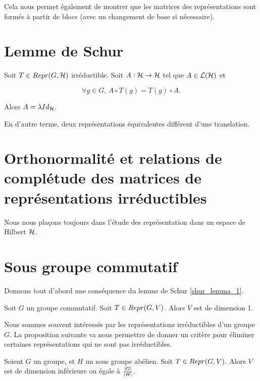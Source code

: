 Cela nous permet également de montrer que les matrices des représentations sont
formés à partir de blocs (avec un changement de base si nécessaire).

\section{Lemme de Schur}

\begin{proposition} 
	\label{shur_lemma_1}
	Soit $T \in Repr(G, \mathcal{H})$ irréductible.
	Soit $A : \mathcal{H} \rightarrow \mathcal{H}$
	tel que $A \in \mathcal{L}(\mathcal{H})$ et

	\begin{equation}
		\forall g \in G, \, A \circ T(g) = T(g) \circ A.
	\end{equation}

	Alors $A = \lambda Id_{\mathcal{H}}$.

	En d'autre terme, deux représentations équivalentes différent d'une
	translation.
\end{proposition}

\section{Orthonormalité et relations de complétude des matrices de
représentations irréductibles}

Nous nous plaçons toujours dans l'étude des représentation dans un espace de
Hilbert $\mathcal{H}$.



\section{Sous groupe commutatif}

Donnons tout d'abord une conséquence du lemme de Schur \ref{shur_lemma_1}.

\begin{proposition}
	Soit $G$ un groupe commutatif.
	Soit $T \in Repr(G, V)$. Alors $V$ est de dimension 1.
\end{proposition}

Nous sommes souvent intéressés par les représentations irréductibles d'un groupe
$G$. La proposition suivante va nous permettre de donner un critère pour
éliminer certaines représentations qui ne sont pas irréductibles.

\begin{proposition}
	Soient $G$ un groupe, et $H$ un sous groupe abélien. 
	Soit $T \in Repr(G, V)$.
	Alors $V$ est de dimension inférieure ou égale à
	$\frac{|G|}{|H|}$.
\end{proposition}
